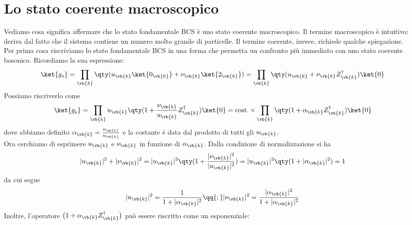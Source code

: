 \section{Lo stato coerente macroscopico}

Vediamo cosa significa affermare che lo stato fondamentale BCS è uno stato coerente macroscopico. Il termine macroscopico è intuitivo: deriva dal fatto che il sistema contiene un numero molto grande di particelle. Il termine coerente, invece, richiede qualche spiegazione.\\
Per prima cosa riscriviamo lo stato fondamentale BCS in una forma che permetta un confronto più immediato con uno stato coerente bosonico. Ricordiamo la sua espressione:
\begin{equation*}
   \ket{g_s}
   =\prod_{\vb{k}} \qty( u_{\vb{k}} \ket{0_{\vb{k}}} + \nu_{\vb{k}} \ket{2_{\vb{k}}} )
   =\prod_{\vb{k}} \qty( u_{\vb{k}} + \nu_{\vb{k}} Z^\dagger_{\vb{k}} ) \ket{0}
\end{equation*}
Possiamo riscriverlo come
\begin{equation*}
   \ket{g_s}
   =\prod_{\vb{k}} u_{\vb{k}} \qty( 1 + \frac{\nu_{\vb{k}}}{u_{\vb{k}}} Z^\dagger_{\vb{k}} ) \ket{0}
   = \text{cost.} \times \prod_{\vb{k}} \qty( 1 + \alpha_{\vb{k}} Z^\dagger_{\vb{k}} ) \ket{0}
\end{equation*}
dove abbiamo definito $\alpha_{\vb{k}}=\frac{\nu_{\vb{k}}}{u_{\vb{k}}}$ e la costante è data dal prodotto di tutti gli $u_{\vb{k}}$.\\
Ora cerchiamo di esprimere $u_{\vb{k}}$ e $\nu_{\vb{k}}$ in funzione di $\alpha_{\vb{k}}$. Dalla condizione di normalizzazione si ha
\begin{equation*}
   |u_{\vb{k}}|^2 + |\nu_{\vb{k}}|^2
   =|u_{\vb{k}}|^2 \qty( 1 + \frac{|\nu_{\vb{k}}|^2}{|u_{\vb{k}}|^2} )
   =|u_{\vb{k}}|^2 \qty( 1 + |\alpha_{\vb{k}}|^2 )
   =1
\end{equation*}
da cui segue
\begin{equation*}
   |u_{\vb{k}}|^2
   =\frac{1}{ 1 + |\alpha_{\vb{k}}|^2 }
   \qq{;}
   |\nu_{\vb{k}}|^2
   =\frac{ |\alpha_{\vb{k}}|^2 }{ 1 + |\alpha_{\vb{k}}|^2 }
\end{equation*}
Inoltre, l'operatore $\bigl( 1 + \alpha_{\vb{k}} Z^\dagger_{\vb{k}} \bigr)$ può essere riscritto come un esponenziale:
